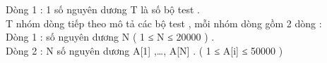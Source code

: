 Dòng 1 : 1 số nguyên dương T là số bộ test .   
\\   T nhóm dòng tiếp theo mô tả các bộ test , mỗi nhóm dòng gồm 2 dòng :   
\\   Dòng 1 : số nguyên dương N  ( 1 ≤ N ≤ 20000 )  .   
\\   Dòng 2 : N số nguyên dương A[1] ,…, A[N] . ( 1 ≤ A[i] ≤ 50000 )   
\\